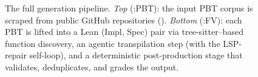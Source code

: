 \begin{figure}[t]
\caption{The full \FVSpec generation pipeline. \emph{Top} (\FVSpec:PBT):
the input PBT corpus is scraped from public GitHub repositories
(). \emph{Bottom} (\FVSpec:FV): each PBT is lifted into a
Lean (Impl, Spec) pair via tree-sitter--based function discovery, an
agentic transpilation step (with the LSP-repair self-loop), and a
deterministic post-production stage that validates, deduplicates, and
grades the output.}
\label{fig:pipeline}
\end{figure}
